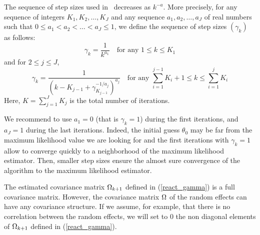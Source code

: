  The sequence of step sizes used in \saemix~decreases as $k^{-a}$. More precisely, for any sequence of integers $K_1,K_2,\ldots,K_J$ and any sequence $a_1,a_2,\ldots,a_J$ of real numbers such that $0\leq a_1 <a_2<\ldots<a_J\leq 1$, we define the sequence of step sizes $(\gamma_k)$ as follows:
\begin{equation} \label{stepsize1}
\gamma_k = \frac{1}{k^{a_1}} \quad \mbox{for any } 1\leq k \leq K_1
\end{equation}
and for $2\leq j \leq J$,
\begin{equation} \label{stepsize2}
\gamma_k = \frac{1}{\left(k - K_{j-1}+\gamma_{K_{j-1}}^{-1/a_j}\right) ^{a_j}} \quad \mbox{for any } \sum_{i=1}^{j-1} K_i +1\leq k \leq \sum_{i=1}^{j} K_i
\end{equation}
Here, $K=\sum_{j=1}^{J}K_j$ is the total number of iterations.

We recommend to use $a_1=0$ (that is $\gamma_k=1$) during the first iterations, and $a_J=1$ during the last iterations. Indeed, the initial guess  $\theta_0$ may  be far  from the maximum likelihood value  we are looking for and the first iterations with $\gamma_k=1$ allow to converge quickly to a neighborhood of the maximum likelihood estimator. Then, smaller step sizes ensure the almost sure convergence of the algorithm to the maximum likelihood estimator.




 The estimated covariance matrix ${{\Omega}_{k+1}}$ defined in (\ref{react_gamma}) is a full covariance matrix. However, the covariance matrix ${\Omega}$ of the random effects can have any covariance structure. If we assume, for example, that there is no correlation between the random effects, we will set to 0 the non diagonal elements of ${{\Omega}_{k+1}}$ defined in (\ref{react_gamma}).

